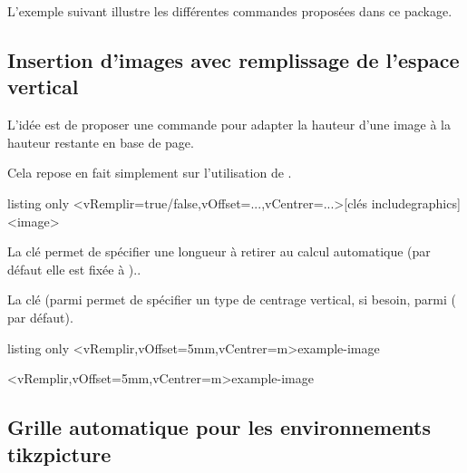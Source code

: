 \documentclass[french,11pt,a4paper]{article}
\begin{document}
L'exemple suivant illustre les différentes commandes proposées dans ce package.

\begin{DemoCode}{}
\end{DemoCode}

\subsection{Insertion d'images avec remplissage de l'espace vertical}

L'idée est de proposer une commande pour adapter la hauteur d'une image à la hauteur restante en base de page.

Cela repose en fait simplement sur l'utilisation de \MontreCode{[height=\textbackslash dimexpr\textbackslash pagegoal-\textbackslash pagetotal\textbackslash relax]}.

\begin{DemoCode}{listing only}
\InsererImage<vRemplir=true/false,vOffset=...,vCentrer=...>[clés includegraphics]<image>
\end{DemoCode}

La clé  permet de spécifier une longueur à retirer au calcul automatique (par défaut elle est fixée à \MontreCode{0pt})..

La clé  (parmi  permet de spécifier un type de centrage vertical, si besoin, parmi  ( par défaut).

\begin{DemoCode}{listing only}
\InsererImage<vRemplir,vOffset=5mm,vCentrer=m>{example-image}
\end{DemoCode}

\InsererImage<vRemplir,vOffset=5mm,vCentrer=m>{example-image}

\subsection{Grille automatique pour les environnements tikzpicture}
\end{document}

